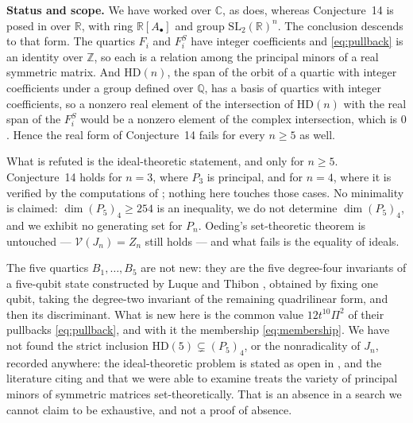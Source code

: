 \documentclass[11pt]{amsart}
\theoremstyle{remark}
\newcommand{\C}{\mathbb C}
\newcommand{\HD}{\mathrm{HD}}
\begin{document}
\medskip
\noindent\textbf{Status and scope.}
We have worked over \(\C\), as \cite{Oeding} does, whereas Conjecture~14 is
posed in \cite{HS} over \(\mathbb R\), with ring \(\mathbb R[A_\bullet]\)
and group \(\mathrm{SL}_2(\mathbb R)^n\). The conclusion descends to that
form. The quartics \(F_i\) and \(F_i^S\) have integer coefficients and
\eqref{eq:pullback} is an identity over \(\mathbb Z\), so each is a
relation among the principal minors of a real symmetric matrix. And
\(\HD(n)\), the span of the orbit of a quartic with integer coefficients
under a group defined over \(\mathbb Q\), has a basis of quartics with
integer coefficients, so a nonzero real element of the intersection of
\(\HD(n)\) with the real span of the \(F_i^S\) would be a nonzero element
of the complex intersection, which is \(0\). Hence the real form of
Conjecture~14 fails for every \(n\geq5\) as well.

What is refuted is the ideal-theoretic statement, and only for
\(n\geq5\). Conjecture~14 holds for \(n=3\), where \(P_3\) is principal,
and for \(n=4\), where it is verified by the computations of
\cite[\S4]{HS}; nothing here touches those cases. No minimality is claimed:
\(\dim(P_5)_4\geq254\) is an inequality, we do not determine
\(\dim(P_5)_4\), and we exhibit no generating set for \(P_n\). Oeding's
set-theoretic theorem is untouched --- \(\mathcal V(J_n)=Z_n\) still holds
--- and what fails is the equality of ideals.

The five quartics \(B_1,\dots,B_5\) are not new: they are the five
degree-four invariants of a five-qubit state constructed by Luque and
Thibon \cite{LT}, obtained by fixing one qubit, taking the degree-two
invariant of the remaining quadrilinear form, and then its discriminant.
What is new here is the common value \(12t^{10}\Pi^2\) of their pullbacks
\eqref{eq:pullback}, and with it the membership \eqref{eq:membership}. We
have not found the strict inclusion \(\HD(5)\subsetneq(P_5)_4\), or the
nonradicality of \(J_n\), recorded anywhere: the ideal-theoretic problem is
stated as open in \cite[p.~1194]{HO}, and the literature citing \cite{HS}
and \cite{Oeding} that we were able to examine treats the variety of
principal minors of symmetric matrices set-theoretically. That is an
absence in a search we cannot claim to be exhaustive, and not a proof of
absence.
\end{document}
